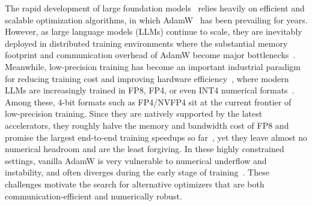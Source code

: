\documentclass{article}
\begin{document}
The rapid development of large foundation models~\citep{brown2020gpt3,touvron2023llama,touvron2023llama2,achiam2023gpt4,team2023gemini,grattafiori2024llama,guo2025deepseek} relies heavily on efficient and scalable optimization algorithms, in which AdamW~\citep{kingma15adam,loshchilov2019adamw} has been prevailing for years. However, as large language models (LLMs) continue to scale, they are inevitably deployed in distributed training environments where the substantial memory footprint and communication overhead of AdamW become major bottlenecks~\citep{shoeybi2019megatron,rajbhandari2020zero,ren2021zero,tang2021_1bitadam,li2022_1bitlamb}. Meanwhile, low-precision training has become an important industrial paradigm for reducing training cost and improving hardware efficiency~\citep{micikevicius2018mixed,liu2024deepseek,yang2025qwen3}, where modern LLMs are increasingly trained in FP8, FP4, or even INT4 numerical formats~\citep{micikevicius2022fp8,peng2023fp8,xi2023int4,ICLR2025fp8scaling,castro2025quartet_fp4,abecassis2025pretraining_fp4,zeng2026glm,xu2026deepseekv4,kimiteam2026kimik3}. Among these, 4-bit formats such as FP4/NVFP4 sit at the current frontier of low-precision training. Since they are natively supported by the latest accelerators, they roughly halve the memory and bandwidth cost of FP8 and promise the largest end-to-end training speedups so far~\citep{chen2025tetrajetv1,castro2025quartet_fp4,abecassis2025pretraining_fp4,chen2026tetrajetv2}, yet they leave almost no numerical headroom and are the least forgiving. In these highly constrained settings, vanilla AdamW is very vulnerable to numerical underflow and instability, and often diverges during the early stage of training~\citep{wortsman2023stable,lee2024fp8,qiu2026why}. These challenges motivate the search for alternative optimizers that are both communication-efficient and numerically robust. 
\end{document}
